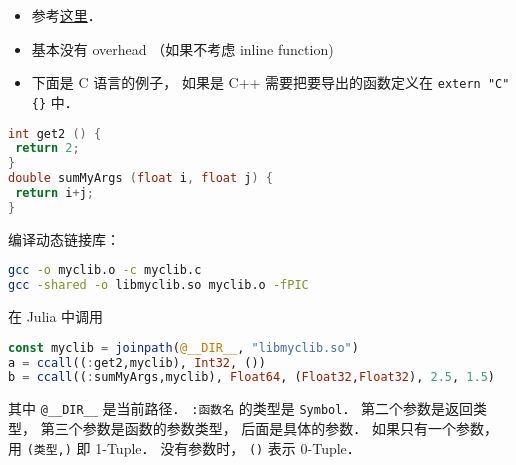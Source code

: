 
\begin{issues}
\issueDraft
\end{issues}

\begin{itemize}
\item 参考\href{https://docs.julialang.org/en/v1/manual/calling-c-and-fortran-code/}{这里}．
\item 基本没有 overhead （如果不考虑 inline function)
\item 下面是 C 语言的例子， 如果是 C++ 需要把要导出的函数定义在 \verb|extern "C" {}| 中．
\end{itemize}

\begin{lstlisting}[language=cpp]
int get2 () {
 return 2;
}
double sumMyArgs (float i, float j) {
 return i+j;
}
\end{lstlisting}

编译动态链接库：
\begin{lstlisting}[language=bash]
gcc -o myclib.o -c myclib.c
gcc -shared -o libmyclib.so myclib.o -fPIC
\end{lstlisting}

在 Julia 中调用
\begin{lstlisting}[language=julia]
const myclib = joinpath(@__DIR__, "libmyclib.so")
a = ccall((:get2,myclib), Int32, ())
b = ccall((:sumMyArgs,myclib), Float64, (Float32,Float32), 2.5, 1.5)
\end{lstlisting}
其中 \verb|@__DIR__| 是当前路径． \verb|:函数名| 的类型是 \verb|Symbol|． 第二个参数是返回类型， 第三个参数是函数的参数类型， 后面是具体的参数． 如果只有一个参数， 用 \verb|(类型,)| 即 1-Tuple． 没有参数时， \verb|()| 表示 0-Tuple．
